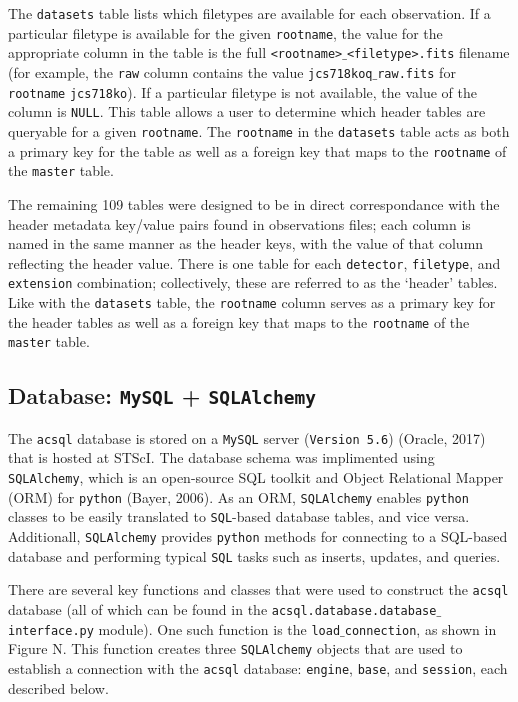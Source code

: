 \documentclass[10pt,journal,compsoc]{IEEEtran}
\begin{document}
The \texttt{datasets} table lists which filetypes are available for each
observation.  If a particular filetype is available for the given \texttt{rootname},
the value for the appropriate column in the table is the full
\texttt{<rootname>$\_$<filetype>.fits} filename (for example, the \texttt{raw} column
contains the value \texttt{jcs718koq$\_$raw.fits} for \texttt{rootname} \texttt{jcs718ko}).
If a particular filetype is not available, the value of the column is \texttt{NULL}.
This table allows a user to determine which header tables are queryable for a given
\texttt{rootname}.  The \texttt{rootname} in the \texttt{datasets} table acts as both
a primary key for the table as well as a foreign key that maps to the \texttt{rootname}
of the \texttt{master} table.

The remaining 109 tables were designed to be in direct correspondance with the
header metadata key/value pairs found in observations files; each column is named in
the same manner as the header keys, with the value of that column reflecting the header
value. There is one table for each \texttt{detector}, \texttt{filetype},
and \texttt{extension} combination; collectively, these are referred to as the `header'
tables.  Like with the \texttt{datasets} table, the \texttt{rootname} column serves as a
primary key for the header tables as well as a foreign key that maps to the \texttt{rootname}
of the \texttt{master} table.


\subsection{Database: \texttt{MySQL} + \texttt{SQLAlchemy}}

The \texttt{acsql} database is stored on a \texttt{MySQL} server (\texttt{Version 5.6})
(Oracle, 2017) that is hosted at STScI.  The database schema was implimented using
\texttt{SQLAlchemy}, which is an open-source SQL toolkit and Object Relational Mapper (ORM) for
\texttt{python} (Bayer, 2006).  As an ORM, \texttt{SQLAlchemy} enables \texttt{python} classes
to be easily translated to \texttt{SQL}-based database tables, and vice versa.  Additionall,
\texttt{SQLAlchemy} provides \texttt{python} methods for connecting to a SQL-based database and
performing typical \texttt{SQL} tasks such as inserts, updates, and queries.

There are several key functions and classes that were used to construct the \texttt{acsql}
database (all of which can be found in the \texttt{acsql.database.database$\_$interface.py} module).
One such function is the \texttt{load$\_$connection}, as shown in Figure N.  This function creates
three \texttt{SQLAlchemy} objects that are used to establish a connection with the \texttt{acsql}
database: \texttt{engine}, \texttt{base}, and \texttt{session}, each described below.
\end{document}
